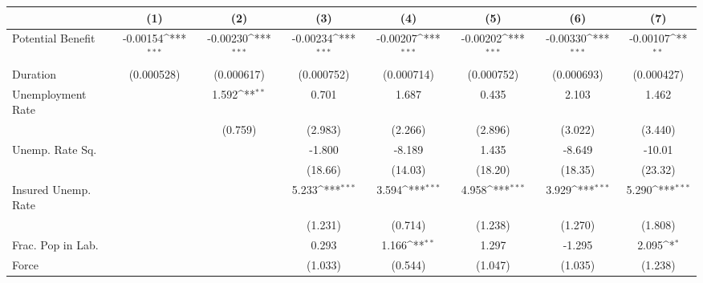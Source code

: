 {
\def\sym#1{\ifmmode^{#1}\else\(^{#1}\)\fi}
\begin{tabular}{l*{7}{c}}
\hline\hline
                    &\multicolumn{1}{c}{(1)}         &\multicolumn{1}{c}{(2)}         &\multicolumn{1}{c}{(3)}         &\multicolumn{1}{c}{(4)}         &\multicolumn{1}{c}{(5)}         &\multicolumn{1}{c}{(6)}         &\multicolumn{1}{c}{(7)}         \\
\hline
Potential Benefit   &    -0.00154\sym{***}&    -0.00230\sym{***}&    -0.00234\sym{***}&    -0.00207\sym{***}&    -0.00202\sym{***}&    -0.00330\sym{***}&    -0.00107\sym{**} \\
Duration            &  (0.000528)         &  (0.000617)         &  (0.000752)         &  (0.000714)         &  (0.000752)         &  (0.000693)         &  (0.000427)         \\
[1em]
Unemployment Rate   &                     &       1.592\sym{**} &       0.701         &       1.687         &       0.435         &       2.103         &       1.462         \\
                    &                     &     (0.759)         &     (2.983)         &     (2.266)         &     (2.896)         &     (3.022)         &     (3.440)         \\
[1em]
Unemp. Rate Sq.     &                     &                     &      -1.800         &      -8.189         &       1.435         &      -8.649         &      -10.01         \\
                    &                     &                     &     (18.66)         &     (14.03)         &     (18.20)         &     (18.35)         &     (23.32)         \\
[1em]
Insured Unemp. Rate &                     &                     &       5.233\sym{***}&       3.594\sym{***}&       4.958\sym{***}&       3.929\sym{***}&       5.290\sym{***}\\
                    &                     &                     &     (1.231)         &     (0.714)         &     (1.238)         &     (1.270)         &     (1.808)         \\
[1em]
Frac. Pop in Lab.   &                     &                     &       0.293         &       1.166\sym{**} &       1.297         &      -1.295         &       2.095\sym{*}  \\
Force               &                     &                     &     (1.033)         &     (0.544)         &     (1.047)         &     (1.035)         &     (1.238)         \\

\end{tabular}}
